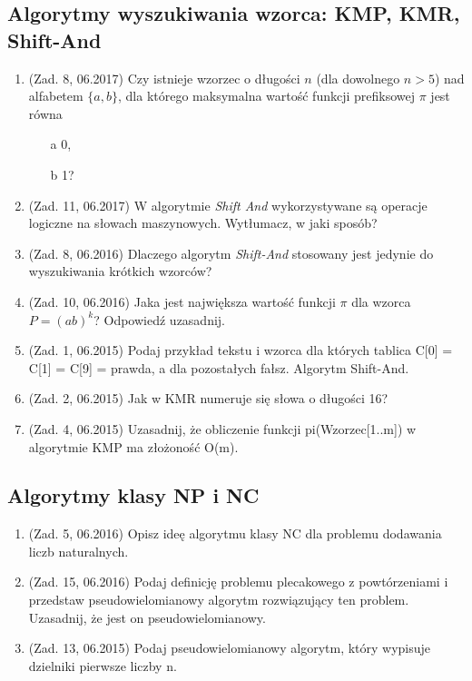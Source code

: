 \documentclass[10pt]{article}%
\begin{document}
\subsection*{Algorytmy wyszukiwania wzorca: KMP, KMR, Shift-And}
\begin{enumerate}
\item (Zad. 8, 06.2017) Czy istnieje wzorzec o długości $n$ (dla dowolnego $n>5$) nad alfabetem $\{a,b\}$, dla którego maksymalna wartość funkcji prefiksowej $\pi$ jest równa 
\begin{itemize}
\item[a] 0,
\item[b] 1?
\end{itemize}

\item (Zad. 11, 06.2017) W algorytmie \emph{Shift And} wykorzystywane są operacje logiczne na słowach maszynowych. Wytłumacz, w jaki sposób?

\item (Zad. 8, 06.2016) Dlaczego algorytm \textit{Shift-And} stosowany jest jedynie do wyszukiwania krótkich wzorców?

\item (Zad. 10, 06.2016) Jaka jest największa wartość funkcji $\pi$ dla wzorca $ P = (ab)^k$? Odpowiedź uzasadnij.

\item (Zad. 1, 06.2015) Podaj przykład tekstu i wzorca dla których tablica C[0] = C[1] = C[9] = prawda, a dla pozostałych fałsz. Algorytm Shift-And.

\item (Zad. 2, 06.2015) Jak w KMR numeruje się słowa o długości 16?

\item (Zad. 4, 06.2015) Uzasadnij, że obliczenie funkcji pi(Wzorzec[1..m]) w algorytmie KMP ma złożoność O(m).
\end{enumerate}
\subsection*{Algorytmy klasy NP i NC}
\begin{enumerate}
\item (Zad. 5, 06.2016) Opisz ideę algorytmu klasy NC dla problemu dodawania liczb naturalnych.

\item (Zad. 15, 06.2016) Podaj definicję problemu plecakowego z powtórzeniami i przedstaw pseudowielomianowy algorytm rozwiązujący ten problem. Uzasadnij, że jest on pseudowielomianowy.

\item (Zad. 13, 06.2015) Podaj pseudowielomianowy algorytm, który wypisuje dzielniki pierwsze liczby n.
\end{enumerate}
\end{document}
